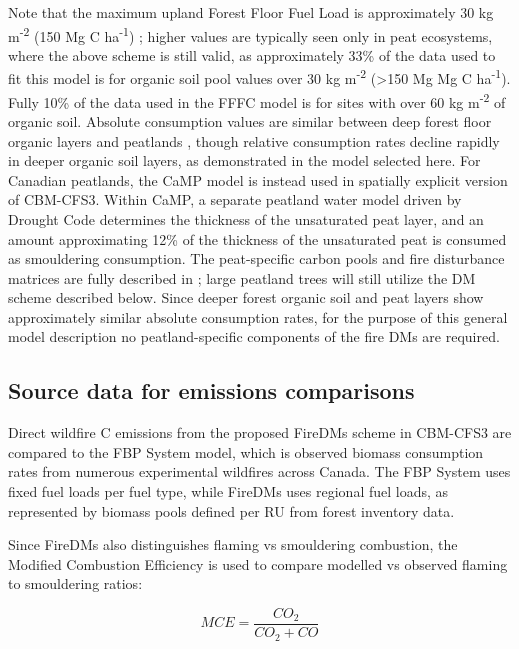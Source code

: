 \documentclass[, manuscript]{copernicus}
\begin{document}
Note that the maximum upland Forest Floor Fuel Load is approximately 30
kg m\textsuperscript{-2} (150 Mg C ha\textsuperscript{-1})
\citep{letang2012}; higher values are typically seen only in peat
ecosystems, where the above scheme is still valid, as approximately 33\%
of the data used to fit this model is for organic soil pool values over
30 kg m\textsuperscript{-2} (\textgreater150 Mg Mg C
ha\textsuperscript{-1}). Fully 10\% of the data used in the FFFC model
is for sites with over 60 kg m\textsuperscript{-2} of organic soil.
Absolute consumption values are similar between deep forest floor
organic layers and peatlands \citep{walker2020}, though relative
consumption rates decline rapidly in deeper organic soil layers, as
demonstrated in the model selected here. For Canadian peatlands, the
CaMP model \citep{bona2020} is instead used in spatially explicit
version of CBM-CFS3. Within CaMP, a separate peatland water model driven
by Drought Code determines the thickness of the unsaturated peat layer,
and an amount approximating 12\% of the thickness of the unsaturated
peat is consumed as smouldering consumption. The peat-specific carbon
pools and fire disturbance matrices are fully described in
\citep{bona2020}; large peatland trees will still utilize the DM scheme
described below. Since deeper forest organic soil and peat layers show
approximately similar absolute consumption rates, for the purpose of
this general model description no peatland-specific components of the
fire DMs are required.

\subsection{Source data for emissions comparisons}

Direct wildfire C emissions from the proposed FireDMs scheme in CBM-CFS3
are compared to the FBP System model, which is observed biomass
consumption rates from numerous experimental wildfires across Canada.
The FBP System uses fixed fuel loads per fuel type, while FireDMs uses
regional fuel loads, as represented by biomass pools defined per RU from
forest inventory data.

Since FireDMs also distinguishes flaming vs smouldering combustion, the
Modified Combustion Efficiency is used to compare modelled vs observed
flaming to smouldering ratios:

\begin{equation}
MCE = \frac{CO_{2}}{CO_{2}+CO}
\end{equation}
\end{document}
